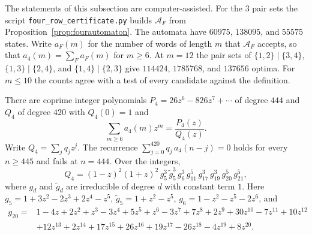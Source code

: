 The statements of this subsection are computer-assisted. For the $3$ pair sets
the script \nolinkurl{four_row_certificate.py} builds $\mathcal A_F$ from
Proposition~\ref{prop:fourautomaton}. The automata have
$60975$, $138095$, and $55575$ states. Write $a_F(m)$ for the number of words of
length $m$ that $\mathcal A_F$ accepts, so that $a_4(m)=\sum_Fa_F(m)$ for
$m\ge6$. At $m=12$ the pair sets of $\{1,2\}\mid\{3,4\}$, $\{1,3\}\mid\{2,4\}$,
and $\{1,4\}\mid\{2,3\}$ give $114424$, $1785768$, and $137656$ optima. For
$m\le10$ the counts agree with a test of every candidate against the definition.

\begin{theorem}\label{thm:fourgfexact}
There are coprime integer polynomials $P_4=26z^6-826z^7+\cdots$ of degree $444$
and $Q_4$ of degree $420$ with $Q_4(0)=1$ and
\[
\sum_{m\ge6}a_4(m)z^m=\frac{P_4(z)}{Q_4(z)}.
\]
Write $Q_4=\sum_jq_jz^j$. The recurrence $\sum_{j=0}^{420}q_j\,a_4(n-j)=0$ holds for
every $n\ge445$ and fails at $n=444$. Over the integers,
\[
Q_4=(1-z)^2(1+z)^2\,g_5^3\,\tilde g_5^3\,g_6^3\,g_{11}^5\,g_{17}^3\,g_{19}^3\,g_{20}^5\,g_{21}^5,
\]
where $g_d$ and $\tilde g_d$ are irreducible of degree $d$ with constant term $1$.
Here $g_5=1+3z^2-2z^3+2z^4-z^5$, $\tilde g_5=1+z^2-z^5$,
$g_6=1-z^2-z^5-2z^6$, and
\begin{align*}
g_{20}={}&1-4z+2z^2+z^3-3z^4+5z^5+z^6-3z^7+7z^8+2z^9+30z^{10}-7z^{11}+10z^{12}\\
&+12z^{13}+2z^{14}+17z^{15}+26z^{16}+19z^{17}-26z^{18}-4z^{19}+8z^{20}.
\end{align*}
\end{theorem}

